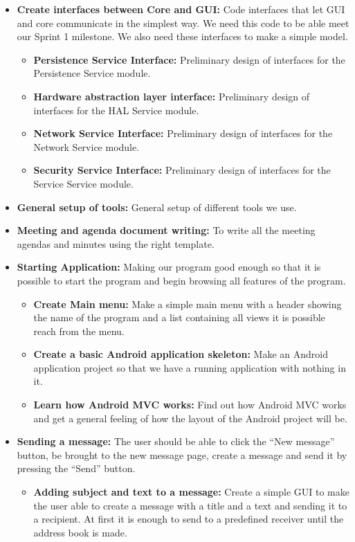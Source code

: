 \begin{itemize}
\item{}\textbf{Create interfaces between Core and GUI:} Code interfaces that let GUI and core communicate in the simplest way. We need this code to be able meet our Sprint 1 milestone. We also need these interfaces to make a simple model.
\begin{itemize}
\item{}\textbf{Persistence Service Interface:} Preliminary design of interfaces for the Persistence Service module.
\item{}\textbf{Hardware abstraction layer interface:} Preliminary design of interfaces for the HAL Service module.
\item{}\textbf{Network Service Interface:} Preliminary design of interfaces for the Network Service module.
\item{}\textbf{Security Service Interface:} Preliminary design of interfaces for the Service Service module.
\end{itemize}
\item{}\textbf{General setup of tools:} General setup of different tools we use.
\item{}\textbf{Meeting and agenda document writing:} To write all the meeting agendas and minutes using the right template.
\item{}\textbf{Starting Application:} Making our program good enough so that it is possible to start the program and begin browsing all features of the program.
\begin{itemize}
\item{}\textbf{Create Main menu:} Make a simple main menu with a header showing the name of the program and a list containing all views it is possible reach from the menu.
\item{}\textbf{Create a basic Android application skeleton:} Make an Android application project so that we have a running application with nothing in it.
\item{}\textbf{Learn how Android MVC works:} Find out how Android MVC works and get a general feeling of how the layout of the Android project will be.
\end{itemize}
\item{}\textbf{Sending a message:} The user should be able to click the “New message” button, be brought to the new message page, create a message and send it by pressing the “Send” button.
\begin{itemize}
\item{}\textbf{Adding subject and text to a message:} Create a simple GUI to make the user able to create a message with a title and a text and sending it to a recipient. At first it is enough to send to a predefined receiver until the address book is made.

\end{itemize}
\end{itemize}
